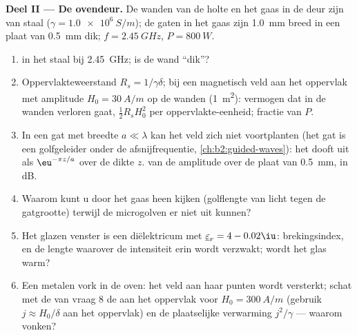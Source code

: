 \begin{problem}
\medskip
\noindent\textbf{Deel II --- De ovendeur.}
De wanden van de holte en het gaas in de deur zijn van staal
($\gamma = \qty{1.0e6}{S/m}$); de gaten in het gaas zijn \qty{1.0}{mm} breed
in een plaat van \qty{0.5}{mm} dik; $f = \qty{2.45}{GHz}$,
$P = \qty{800}{W}$.
\begin{enumerate}[resume]
  \item {} in het staal bij \qty{2.45}{GHz}; is de wand ``dik''?
  \item Oppervlakteweerstand $R_s = 1/\gamma\delta$; bij een magnetisch veld
        aan het oppervlak met amplitude $H_0 = \qty{30}{A/m}$ op de wanden
        (\qty{1}{m^2}): vermogen dat in de wanden verloren gaat,
        $\tfrac12R_sH_0^2$ per oppervlakte-eenheid; fractie van $P$.
  \item In een gat met breedte $a \ll \lambda$ kan het veld zich niet
        voortplanten (het gat is een golfgeleider onder de afsnijfrequentie,
        \cref{ch:b2:guided-waves}): het dooft uit als $\eu^{-\pi z/a}$ over
        de dikte $z$.  van de amplitude over de plaat van
        \qty{0.5}{mm}, in dB.
  \item Waarom kunt u door het gaas heen kijken (golflengte van licht tegen
        de gatgrootte) terwijl de microgolven er niet uit kunnen?
  \item Het glazen venster is een diëlektricum met
        $\underline\varepsilon_r = 4 - 0.02\iu$: brekingsindex, en de lengte
        waarover de intensiteit erin wordt verzwakt; wordt het glas warm?
  \item Een metalen vork in de oven: het veld aan haar punten wordt
        versterkt; schat met de  van vraag 8 de 
        aan het oppervlak voor $H_0 = \qty{300}{A/m}$ (gebruik
        $j \approx H_0/\delta$ aan het oppervlak) en de plaatselijke
        verwarming $j^2/\gamma$ --- waarom vonken?
\end{enumerate}


\end{problem}
